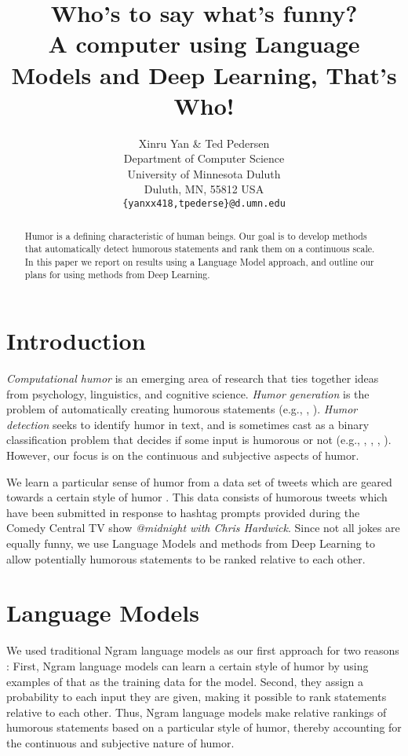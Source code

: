 \documentclass[11pt,a4paper]{article}
\title{Who's to say what's funny?\\
A computer using Language Models and Deep Learning, That's Who!}
\author{Xinru Yan \& Ted Pedersen\\
  Department of Computer Science \\ 
  University of Minnesota Duluth \\ 
   Duluth, MN, 55812 USA \\
  {\tt \{yanxx418,tpederse\}@d.umn.edu}}
\date{}
\begin{document}
\maketitle
\begin{abstract}
Humor is a defining characteristic of human beings. 
Our goal is to develop methods that automatically 
detect humorous statements and rank them on a 
continuous scale. In this paper we report on results 
using a Language Model approach, and outline our
plans for using methods from Deep Learning.
\end{abstract}

\section{Introduction}
\textit{Computational humor} is an emerging area of 
research that ties together ideas from psychology, 
linguistics, and cognitive science. 
\textit{Humor generation} is the problem of automatically
creating humorous statements 
(e.g., \cite{StockS03}, \cite{OzbalS12}).
\textit{Humor detection} seeks to identify humor in text, 
and is sometimes cast as a binary classification problem that 
decides if some input is humorous or not 
(e.g., \cite{MihalceaS06}, 
\cite{ZhangL14}, \cite{ShahafHM15},
\cite{MillerG15}). However, our focus is on  
the continuous and subjective aspects of humor. 

We learn a particular sense of humor from a data set of
tweets which are geared towards a certain style of humor
\cite{PotashRR16}. 
This data consists of humorous tweets which have been
submitted in response to hashtag prompts provided
during the Comedy
Central TV show \textit{@midnight with Chris Hardwick}.
Since not all jokes are equally funny, we use Language
Models and methods from Deep Learning to allow 
potentially humorous statements to be ranked relative to 
each other. 

\section{Language Models}

We used traditional Ngram language models as our first 
approach for two reasons : 
First, Ngram language models can learn a certain style of 
humor by using examples of that as the training data for the model.
Second, they assign a probability to each input they are given,
making it possible to rank statements relative to each other.  
Thus, Ngram language models make relative rankings 
of humorous statements
based on a particular style of humor, thereby accounting for the 
continuous and subjective nature of humor. 
\end{document}
